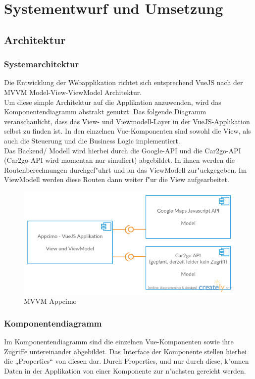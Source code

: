 \documentclass[a4paper, 11pt]{scrreprt}
\begin{document}
\chapter{Systementwurf und Umsetzung}

\section{Architektur}

\subsection{Systemarchitektur}
Die Entwicklung der Webapplikation richtet sich entsprechend VueJS nach der MVVM Model-View-ViewModel Architektur. \\
Um diese simple Architektur auf die Applikation anzuwenden, wird das Komponentendiagramm abstrakt genutzt. Das folgende Diagramm veranschaulicht, dass das View- und Viewmodell-Layer in der VueJS-Applikation selbst zu finden ist. In den einzelnen Vue-Komponenten sind sowohl die View, als auch die Steuerung und die Business Logic implementiert. \\

Das Backend/ Modell wird hierbei durch die Google-API und die Car2go-API (Car2go-API wird momentan nur simuliert) abgebildet. In ihnen werden die Routenberechnungen durchgef"uhrt und an das ViewModell zur"uckgegeben. Im ViewModell werden diese Routen dann weiter f"ur die View aufgearbeitet.\\

\begin{figure} [H]
\begin{center}
\includegraphics[scale=1]{mvvmappcimo.png}
\caption{MVVM Appcimo}
\label{MVVMAppcimo}
\end{center}
\end{figure}

\subsection{Komponentendiagramm}
Im Komponentendiagramm sind die einzelnen Vue-Komponenten sowie ihre Zugriffe untereinander abgebildet. Das Interface der Komponente stellen hierbei die „Properties“ von diesen dar. Durch Properties, und nur durch diese, k"onnen Daten in der Applikation von einer Komponente zur n"achsten gereicht werden.
\end{document}
